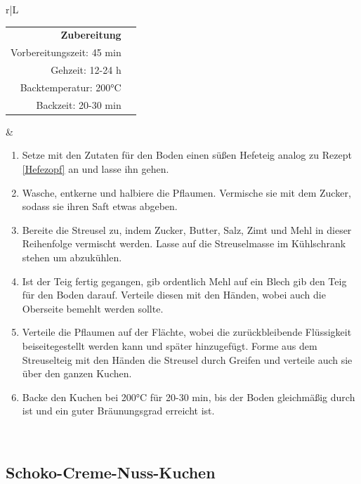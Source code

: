 \documentclass[a4paper, 12pt]{scrbook} 								%
\numberwithin{equation}{section} 									%
\begin{document}
			\newpage
			\begin{tabularx}{\textwidth}{r|L}
			
			\begin{tabular}[t]{rr}
				\textbf{Zubereitung}	\\
				Vorbereitungszeit: 45 min	\\
				Gehzeit: 12-24 h			\\
				Backtemperatur: 200°C		\\
				Backzeit: 20-30 min 
			\end{tabular}			&	\begin{enumerate}[]
											\item Setze mit den Zutaten für den Boden einen süßen Hefeteig analog zu Rezept \ref{Hefezopf} an und lasse ihn gehen.
											\item Wasche, entkerne und halbiere die Pflaumen. Vermische sie mit dem Zucker, sodass sie ihren Saft etwas abgeben.
											\item Bereite die Streusel zu, indem Zucker, Butter, Salz, Zimt und Mehl in dieser Reihenfolge vermischt werden. Lasse auf die Streuselmasse im Kühlschrank stehen um abzukühlen.
											\item Ist der Teig fertig gegangen, gib ordentlich Mehl auf ein Blech gib den Teig für den Boden darauf. Verteile diesen mit den Händen, wobei auch die Oberseite bemehlt werden sollte. 
											\item Verteile die Pflaumen auf der Flächte, wobei die zurückbleibende Flüssigkeit beiseitegestellt werden kann und später hinzugefügt. Forme aus dem Streuselteig mit den Händen die Streusel durch Greifen und verteile auch sie über den ganzen Kuchen.
											\item Backe den Kuchen bei 200°C für 20-30 min, bis der Boden gleichmäßig durch ist und ein guter Bräunungsgrad erreicht ist.
										\end{enumerate}	\\
		\end{tabularx}
		\newpage
		

		\subsection{Schoko-Creme-Nuss-Kuchen}	\label{schokoCremeNussKuchen}
\end{document}
